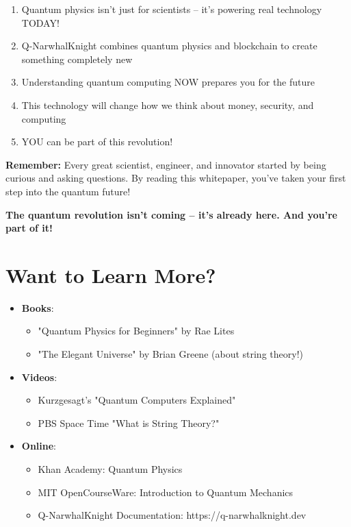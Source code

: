 \documentclass[11pt,a4paper]{article}
\begin{document}
\begin{tcolorbox}[colback=coolblue!10,colframe=coolblue,title=\textbf{Key Takeaways}]
\Large
\begin{enumerate}
    \item Quantum physics isn't just for scientists -- it's powering real technology TODAY!

    \item Q-NarwhalKnight combines quantum physics and blockchain to create something completely new

    \item Understanding quantum computing NOW prepares you for the future

    \item This technology will change how we think about money, security, and computing

    \item YOU can be part of this revolution!
\end{enumerate}
\end{tcolorbox}

\vspace{1cm}

\textbf{Remember:} Every great scientist, engineer, and innovator started by being curious and asking questions. By reading this whitepaper, you've taken your first step into the quantum future!

\textbf{The quantum revolution isn't coming -- it's already here. And you're part of it!} 

\section*{Want to Learn More?}

\begin{itemize}
    \item \textbf{Books}:
    \begin{itemize}
        \item "Quantum Physics for Beginners" by Rae Lites
        \item "The Elegant Universe" by Brian Greene (about string theory!)
    \end{itemize}

    \item \textbf{Videos}:
    \begin{itemize}
        \item Kurzgesagt's "Quantum Computers Explained"
        \item PBS Space Time "What is String Theory?"
    \end{itemize}

    \item \textbf{Online}:
    \begin{itemize}
        \item Khan Academy: Quantum Physics
        \item MIT OpenCourseWare: Introduction to Quantum Mechanics
        \item Q-NarwhalKnight Documentation: https://q-narwhalknight.dev
    \end{itemize}
\end{itemize}
\end{document}
